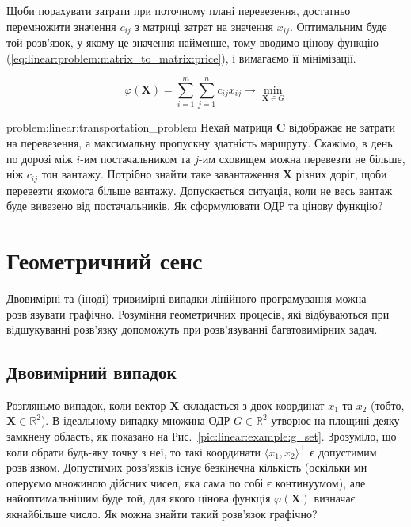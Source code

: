 \documentclass[\main/book.tex]{subfiles}
\begin{document}
Щоби порахувати затрати при поточному плані перевезення, достатньо перемножити значення $c_{ij}$ з матриці затрат на значення $x_{ij}$. Оптимальним буде той розв'язок, у якому це значення найменше, тому вводимо цінову функцію (\ref{eq:linear:problem:matrix_to_matrix:price}), і вимагаємо її мінімізації.

\begin{equation}
 \varphi(\mathbf{X}) =
 \sum_{i=1}^m \sum_{j=1}^n
 c_{ij} x_{ij}
 \rightarrow \min_{\mathbf{X} \in G}
 \label{eq:linear:problem:matrix_to_matrix:price}
\end{equation}

\begin{problem}{problem:linear:transportation_problem}
 Нехай матриця $\mathbf{C}$ відображає не затрати на перевезення, а максимальну пропускну здатність маршруту. Скажімо, в день по дорозі між $i$-им постачальником та $j$-им сховищем можна перевезти не більше, ніж $c_{ij}$ тон вантажу. Потрібно знайти таке завантаження $\mathbf{X}$ різних доріг, щоби перевезти якомога більше вантажу. Допускається ситуація, коли не весь вантаж буде вивезено від постачальників. Як сформулювати ОДР та цінову функцію?
\end{problem}

\section{Геометричний сенс}
\label{section:linear:geometrical}

Двовимірні та (іноді) тривимірні випадки лінійного програмування можна розв'язувати графічно. Розуміння геометричних процесів, які відбуваються при відшукуванні розв'язку допоможуть при розв'язуванні багатовимірних задач.

\subsection{Двовимірний випадок}

Розгляньмо випадок, коли вектор $\mathbf{X}$ складається з двох координат $x_1$ та $x_2$ (тобто, ${\mathbf{X} \in \mathbb{R}^2}$). В ідеальному випадку множина ОДР ${G \in \mathbb{R}^2}$ утворює на площині деяку замкнену область, як показано на Рис.~\ref{pic:linear:example:g_set}. Зрозуміло, що коли обрати будь-яку точку з неї, то такі координати ${\langle x_1, x_2 \rangle}^\top$ є допустимим розв'язком. Допустимих розв'язків існує безкінечна кількість (оскільки ми оперуємо множиною дійсних чисел, яка сама по собі є континуумом), але найоптимальнішим буде той, для якого цінова функція $\varphi(\mathbf{X})$ визначає якнайбільше число. Як можна знайти такий розв'язок графічно?
\end{document}
